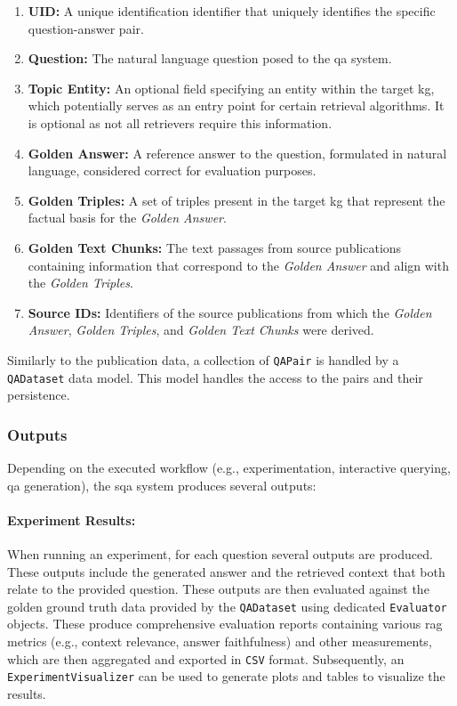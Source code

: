 \begin{enumerate}
    \item \textbf{UID:} A unique identification identifier that uniquely identifies the specific question-answer pair.
    \item \textbf{Question:} The natural language question posed to the \gls{qa} system.
    \item \textbf{Topic Entity:} An optional field specifying an entity within the target \gls{kg}, which potentially serves as an entry point for certain retrieval algorithms. It is optional as not all retrievers require this information.
    \item \textbf{Golden Answer:} A reference answer to the question, formulated in natural language, considered correct for evaluation purposes.
    \item \textbf{Golden Triples:} A set of triples present in the target \gls{kg} that represent the factual basis for the \emph{Golden Answer}.
    \item \textbf{Golden Text Chunks:} The text passages from source publications containing information that correspond to the \emph{Golden Answer} and align with the \emph{Golden Triples}.
    \item \textbf{Source IDs:} Identifiers of the source publications from which the \emph{Golden Answer}, \emph{Golden Triples}, and \emph{Golden Text Chunks} were derived.
\end{enumerate}

Similarly to the publication data, a collection of \texttt{QAPair} is handled by a \texttt{QADataset} data model. This model handles the access to the pairs and their persistence.


\subsubsection{Outputs}
Depending on the executed workflow (e.g., experimentation, interactive querying, \gls{qa} generation), the \gls{sqa} system produces several outputs:

\paragraph{Experiment Results:} 
When running an experiment, for each question several outputs are produced. These outputs include the generated answer and the retrieved context that both relate to the provided question. These outputs are then evaluated against the golden ground truth data provided by the \texttt{QADataset} using dedicated \texttt{Evaluator} objects. These produce comprehensive evaluation reports containing various \gls{rag} metrics (e.g., context relevance, answer faithfulness) and other measurements, which are then aggregated and exported in \texttt{CSV} format. Subsequently, an \texttt{ExperimentVisualizer} can be used to generate plots and tables to visualize the results.

